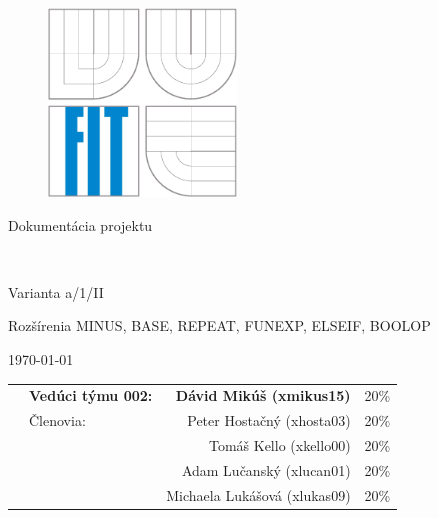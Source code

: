 \begin{titlepage}

\begin{figure}[!h]
  \centering
  \includegraphics[height=5cm]{img/logo.eps}
\end{figure}

\vfill

\begin{center}
\begin{Large}
Dokumentácia projektu\\
\end{Large}

\bigskip

	\begin{Huge}
		\projname\\
	\end{Huge}

	\begin{large}
		Varianta a/1/II\\
		{\small Rozšírenia MINUS, BASE, REPEAT, FUNEXP, ELSEIF, BOOLOP \par}
	\end{large}
\end{center}

\vfill

\begin{center}
\begin{Large}
\today
\end{Large}
\end{center}

\vfill

\begin{flushleft}

	\begin{large}
		\begin{tabularx}{\linewidth}{Xlrl}
		   & \textbf{Vedúci týmu 002:} & \textbf{Dávid Mikúš (xmikus15)} & 20\% \\
		   & Členovia: & Peter Hostačný (xhosta03) & 20\% \\
		   &           & Tomáš Kello (xkello00) & 20\% \\
		   &           & Adam Lučanský (xlucan01) & 20\% \\
		   &           & Michaela Lukášová (xlukas09) & 20\%
		\end{tabularx}
	\end{large}
\end{flushleft}
\end{titlepage}
